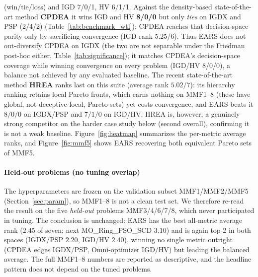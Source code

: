(win/tie/loss) and IGD 7/0/1, HV 6/1/1. Against the density-based state-of-the-art method \textbf{CPDEA} it
wins IGD and HV \textbf{8/0/0} but only \emph{ties} on IGDX and PSP (2/4/2)
(Table~\ref{tab:benchmark_wtl}); CPDEA reaches that decision-space parity only by
sacrificing convergence (IGD rank 5.25/6). Thus EARS does not out-diversify CPDEA on
IGDX (the two are not separable under the Friedman post-hoc either, Table~\ref{tab:significance});
it matches CPDEA's decision-space coverage while winning convergence on every problem (IGD/HV
8/0/0), a balance not achieved by any evaluated baseline. The recent state-of-the-art method \textbf{HREA} ranks
last on this suite (average rank $5.02/7$): its hierarchy ranking retains local Pareto fronts,
which earns nothing on MMF1--8 (these have global, not deceptive-local, Pareto sets) yet costs
convergence, and EARS beats it $8/0/0$ on IGDX/PSP and $7/1/0$ on IGD/HV. HREA is, however, a
genuinely strong competitor on the harder case study below (second overall), confirming it is
not a weak baseline. Figure~\ref{fig:heatmap} summarizes the per-metric average ranks, and
Figure~\ref{fig:mmf5} shows EARS recovering both equivalent Pareto sets of MMF5.

\paragraph{Held-out problems (no tuning overlap)} The hyperparameters are frozen on the
validation subset MMF1/MMF2/MMF5 (Section~\ref{sec:param}), so MMF1--8 is not a clean test set. We
therefore re-read the result on the five \emph{held-out} problems MMF3/4/6/7/8, which never
participated in tuning. The conclusion is unchanged: EARS has the best all-metric average rank
($2.45$ of seven; next MO\_Ring\_PSO\_SCD $3.10$) and is again top-2 in both spaces (IGDX/PSP
$2.20$, IGD/HV $2.40$), winning no single metric outright (CPDEA edges IGDX/PSP, Omni-optimizer
IGD/HV) but leading the balanced average. The full MMF1--8 numbers are reported as descriptive,
and the headline pattern does not depend on the tuned problems.





